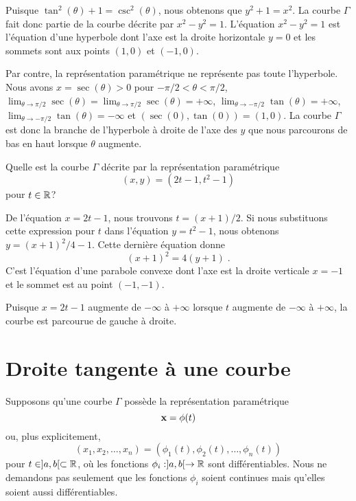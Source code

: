 {\begin{egg}
Puisque $\tan^2(\theta) +1 = \csc^2(\theta)$, nous obtenons que
$y^2 + 1 = x^2$.  La courbe $\Gamma$ fait donc partie de la courbe
décrite par $x^2-y^2=1$.  L'équation $x^2-y^2=1$ est l'équation d'une
hyperbole dont l'axe est la droite horizontale $y=0$ et les sommets
sont aux points $(1,0)$ et $(-1,0)$.

Par contre, la représentation paramétrique ne représente pas toute
l'hyperbole.  Nous avons $x = \sec(\theta) >0$ pour
$-\pi/2<\theta<\pi/2$,
$\displaystyle \lim_{\theta \to \pi/2} \sec(\theta) = 
\lim_{\theta \to \pi/2} \sec(\theta) =  +\infty$, 
$\displaystyle \lim_{\theta \to -\pi/2} \tan(\theta) = +\infty$,
$\displaystyle \lim_{\theta \to -\pi/2} \tan(\theta) =  -\infty$
et $(\sec(0), \tan(0)) = (1,0)$.  La courbe $\Gamma$ est donc la
branche de l'hyperbole à droite de l'axe des $y$ que nous parcourons de
bas en haut lorsque $\theta$ augmente.
\end{egg}

\begin{egg}
Quelle est la courbe $\Gamma$ décrite par la représentation
paramétrique
\[
(x,y) = (2t-1, t^2-1)
\]
pour $t\in \mathbb{R}$?

De l'équation $x= 2t-1$, nous trouvons $t = (x+1)/2$.  Si nous substituons
cette expression pour $t$ dans l'équation $y=t^2-1$, nous obtenons
$y = (x+1)^2/4 -1$.  Cette dernière équation donne
\[
(x+1)^2 = 4(y+1) \; .
\]
C'est l'équation d'une parabole convexe dont l'axe est la droite
verticale $x=-1$ et le sommet est au point $(-1,-1)$.

Puisque $x=2t-1$ augmente de $-\infty$ à $+\infty$ lorsque $t$
augmente de $-\infty$ à $+\infty$, la courbe est parcourue de gauche à
droite.
\end{egg}

\section{Droite tangente à une courbe}\label{DTcourbe}

Supposons qu'une courbe $\Gamma$ possède la représentation
paramétrique
\[
\mathbf{x} = \phi(t)
\]
ou, plus explicitement,
\[
(x_1,x_2, \ldots, x_n) = (\phi_1(t), \phi_2(t), \ldots, \phi_n(t))
\]
pour $t \in ]a,b[ \subset \mathbb{R}$, où les fonctions
$\phi_i:]a,b[ \rightarrow \mathbb{R}$ sont différentiables.  Nous ne demandons
pas seulement que les fonctions $\phi_i$ soient continues mais
qu'elles soient aussi différentiables.

}
